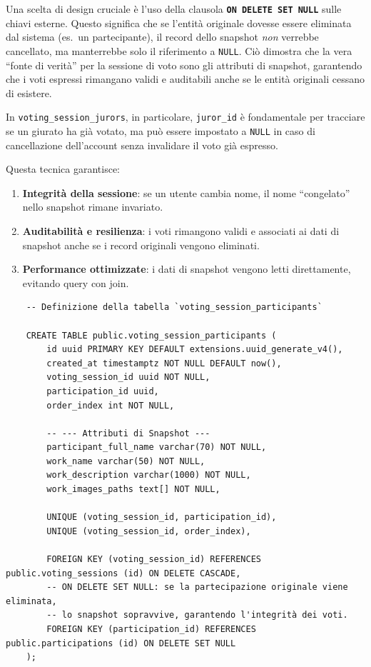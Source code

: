 Una scelta di design cruciale è l'uso della clausola \textbf{\texttt{ON DELETE SET NULL}} sulle chiavi esterne.
Questo significa che se l'entità originale dovesse essere eliminata dal sistema (es.\ un partecipante), il record dello snapshot \emph{non} verrebbe cancellato, ma manterrebbe solo il riferimento a \texttt{NULL}.
Ciò dimostra che la vera ``fonte di verità'' per la sessione di voto sono gli attributi di snapshot, garantendo che i voti espressi rimangano validi e auditabili anche se le entità originali cessano di esistere.

In \texttt{voting\_session\_jurors}, in particolare, \texttt{juror\_id} è fondamentale per tracciare se un giurato ha già votato, ma può essere impostato a \texttt{NULL} in caso di cancellazione dell'account senza invalidare il voto già espresso.

Questa tecnica garantisce:
\begin{enumerate}
    \item \textbf{Integrità della sessione}: se un utente cambia nome, il nome ``congelato'' nello snapshot rimane invariato.
    \item \textbf{Auditabilità e resilienza}: i voti rimangono validi e associati ai dati di snapshot anche se i record originali vengono eliminati.
    \item \textbf{Performance ottimizzate}: i dati di snapshot vengono letti direttamente, evitando query con join.
\end{enumerate}

\begin{longlisting}
    \begin{verbatim}
    -- Definizione della tabella `voting_session_participants`

    CREATE TABLE public.voting_session_participants (
        id uuid PRIMARY KEY DEFAULT extensions.uuid_generate_v4(),
        created_at timestamptz NOT NULL DEFAULT now(),
        voting_session_id uuid NOT NULL,
        participation_id uuid,
        order_index int NOT NULL,

        -- --- Attributi di Snapshot ---
        participant_full_name varchar(70) NOT NULL,
        work_name varchar(50) NOT NULL,
        work_description varchar(1000) NOT NULL,
        work_images_paths text[] NOT NULL,

        UNIQUE (voting_session_id, participation_id),
        UNIQUE (voting_session_id, order_index),

        FOREIGN KEY (voting_session_id) REFERENCES public.voting_sessions (id) ON DELETE CASCADE,
        -- ON DELETE SET NULL: se la partecipazione originale viene eliminata,
        -- lo snapshot sopravvive, garantendo l'integrità dei voti.
        FOREIGN KEY (participation_id) REFERENCES public.participations (id) ON DELETE SET NULL
    );
    \end{verbatim}
    \caption{Definizione della tabella ``voting\_session\_participants'' per lo snapshot dei dati dei partecipanti.}
    \label{lst:snapshot_participants}
\end{longlisting}

